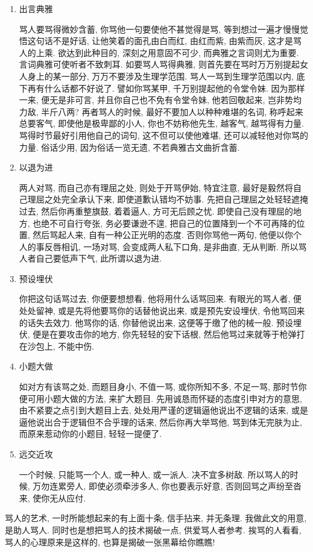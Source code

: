 \begin{enumerate}
\item 出言典雅

骂人要骂得微妙含蓄, 你骂他一句要使他不甚觉得是骂, 等到想过一遍才慢慢觉悟这句话不是好话, 让他笑着的面孔由白而红, 由红而紫, 由紫而灰, 这才是骂人的上乘. 欲达到此种目的, 深刻之用意固不可少, 而典雅之言词则尤为重要. 言词典雅可使听者不致刺耳. 如要骂人骂得典雅, 则首先要在骂时万万别提起女人身上的某一部分, 万万不要涉及生理学范围. 骂人一骂到生理学范围以内, 底下再有什么话都不好说了. 譬如你骂某甲, 千万别提起他的令堂令妹. 因为那样一来, 便无是非可言, 并且你自己也不免有令堂令妹, 他若回敬起来, 岂非势均力敌, 半斤八两? 再者骂人的时候, 最好不要加人以种种难堪的名词, 称呼起来总要客气, 即使他是极卑鄙的小人, 你也不妨称他先生, 越客气, 越骂得有力量. 骂得时节最好引用他自己的词句, 这不但可以使他难堪, 还可以减轻他对你骂的力量. 俗话少用, 因为俗话一览无遗, 不若典雅古文曲折含蓄. 

\item 以退为进

两人对骂, 而自己亦有理屈之处, 则处于开骂伊始, 特宜注意, 最好是毅然将自己理屈之处完全承认下来, 即使道歉认错均不妨事. 先把自己理屈之处轻轻遮掩过去, 然后你再重整旗鼓, 着着逼人, 方可无后顾之忧. 即使自己没有理屈的地方, 也绝不可自行夸张, 务必要谦逊不遑, 把自己的位置降到一个不可再降的位置, 然后骂起人来, 自有一种公正光明的态度. 否则你骂他一两句, 他便以你个人的事反唇相讥, 一场对骂, 会变成两人私下口角, 是非曲直, 无从判断. 所以骂人者自己要低声下气, 此所谓以退为进. 

\item 预设埋伏

你把这句话骂过去, 你便要想想看, 他将用什么话骂回来. 有眼光的骂人者, 便处处留神, 或是先将他要骂你的话替他说出来, 或是预先安设埋伏, 令他骂回来的话失去效力. 他骂你的话, 你替他说出来, 这便等于缴了他的械一般. 预设埋伏, 便是在要攻击你的地方, 你先轻轻的安下话根, 然后他骂过来就等于枪弹打在沙包上, 不能中伤. 

\item 小题大做

如对方有该骂之处, 而题目身小, 不值一骂, 或你所知不多, 不足一骂, 那时节你便可用小题大做的方法, 来扩大题目. 先用诚恳而怀疑的态度引申对方的意思, 由不紧要之点引到大题目上去, 处处用严谨的逻辑逼他说出不逻辑的话来, 或是逼他说出合于逻辑但不合乎理的话来, 然后你再大举骂他, 骂到体无完肤为止, 而原来惹动你的小题目, 轻轻一提便了. 

\item 远交近攻

一个时候, 只能骂一个人, 或一种人, 或一派人. 决不宜多树敌. 所以骂人的时候, 万勿连累旁人, 即使必须牵涉多人, 你也要表示好意, 否则回骂之声纷至沓来, 使你无从应付. 

\end{enumerate}

骂人的艺术, 一时所能想起来的有上面十条, 信手拈来, 并无条理. 我做此文的用意, 是助人骂人. 同时也是想把骂人的技术揭破一点, 供爱骂人者参考. 挨骂的人看看, 骂人的心理原来是这样的, 也算是揭破一张黑幕给你瞧瞧!
